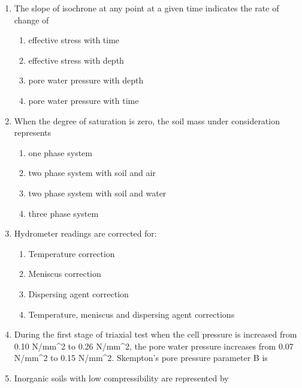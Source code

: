 \documentclass[11pt,a4paper]{article}
\begin{document}
\begin{enumerate}
\begin{enumerate}[label=\Alph*.]
\end{enumerate}
\item{The slope of isochrone at any point at a given time indicates the rate of change of}
\begin{enumerate}[label=\Alph*.]
\item{effective stress with time}
\item{effective stress with depth}
\item{pore water pressure with depth}
\item{pore water pressure with time}
\end{enumerate}
\item{When the degree of saturation is zero, the soil mass under consideration represents}
\begin{enumerate}[label=\Alph*.]
\item{one phase system}
\item{two phase system with soil and air}
\item{two phase system with soil and water}
\item{three phase system}
\end{enumerate}
\item{Hydrometer readings are corrected for:}
\begin{enumerate}[label=\Alph*.]
\item{Temperature correction}
\item{Meniscus correction}
\item{Dispersing agent correction}
\item{Temperature, meniscus and dispersing agent corrections}
\end{enumerate}
\item{During the first stage of triaxial test when the cell pressure is increased from 0.10 N/mm\^{}2 to 0.26 N/mm\^{}2, the pore water pressure increases from 0.07 N/mm\^{}2 to 0.15 N/mm\^{}2. Skempton's pore pressure parameter B is
}
\\
\item{Inorganic soils with low compressibility are represented by}
\\\begin{enumerate*}[itemjoin=\qquad, label=\Alph*.]

\end{enumerate*}
\end{enumerate}
\end{document}
